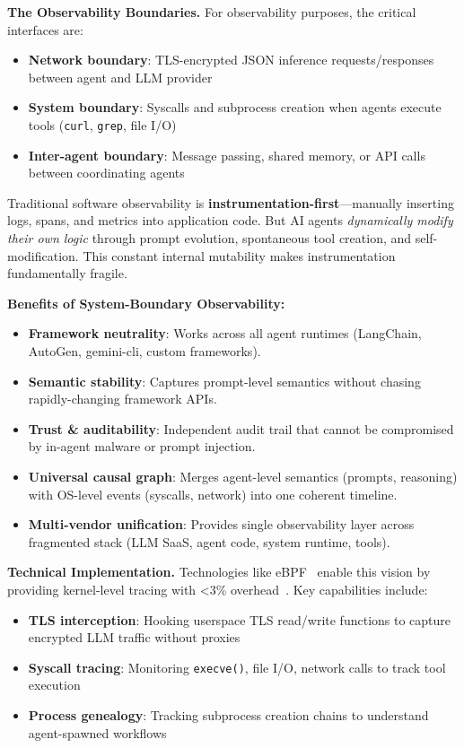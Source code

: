 \documentclass[sigplan,screen，review,9pt]{acmart}
\begin{document}
\textbf{The Observability Boundaries.} For observability purposes, the critical interfaces are:
\begin{itemize}
  \item \textbf{Network boundary}: TLS-encrypted JSON inference requests/responses between agent and LLM provider
  \item \textbf{System boundary}: Syscalls and subprocess creation when agents execute tools (\texttt{curl}, \texttt{grep}, file I/O)
  \item \textbf{Inter-agent boundary}: Message passing, shared memory, or API calls between coordinating agents
\end{itemize}

Traditional software observability is \textbf{instrumentation-first}—manually inserting logs, spans, and metrics into application code. But AI agents \emph{dynamically modify their own logic} through prompt evolution, spontaneous tool creation, and self-modification. This constant internal mutability makes instrumentation fundamentally fragile.

\textbf{Benefits of System-Boundary Observability:}
\begin{itemize}
  \item \textbf{Framework neutrality}: Works across all agent runtimes (LangChain, AutoGen, gemini-cli, custom frameworks).
  \item \textbf{Semantic stability}: Captures prompt-level semantics without chasing rapidly-changing framework APIs.
  \item \textbf{Trust \& auditability}: Independent audit trail that cannot be compromised by in-agent malware or prompt injection.
  \item \textbf{Universal causal graph}: Merges agent-level semantics (prompts, reasoning) with OS-level events (syscalls, network) into one coherent timeline.
  \item \textbf{Multi-vendor unification}: Provides single observability layer across fragmented stack (LLM SaaS, agent code, system runtime, tools).
\end{itemize}

\textbf{Technical Implementation.} Technologies like eBPF~\cite{brendangregg,ebpfio} enable this vision by providing kernel-level tracing with <3\% overhead~\cite{zheng2025extending}. Key capabilities include:
\begin{itemize}
  \item \textbf{TLS interception}: Hooking userspace TLS read/write functions to capture encrypted LLM traffic without proxies
  \item \textbf{Syscall tracing}: Monitoring \texttt{execve()}, file I/O, network calls to track tool execution
  \item \textbf{Process genealogy}: Tracking subprocess creation chains to understand agent-spawned workflows
\end{itemize}
\end{document}
